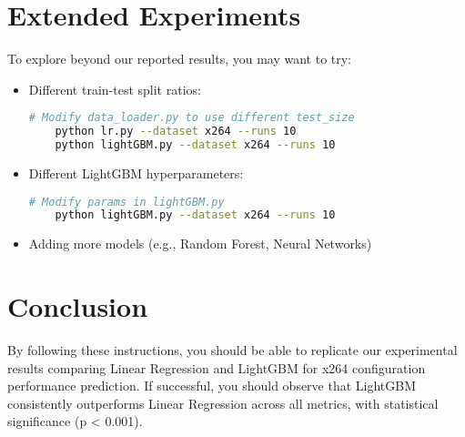 \documentclass[10pt]{article}
\begin{document}
\section{Extended Experiments}

To explore beyond our reported results, you may want to try:

\begin{itemize}
    \item Different train-test split ratios:
    \begin{lstlisting}[language=bash]
    # Modify data_loader.py to use different test_size
    python lr.py --dataset x264 --runs 10
    python lightGBM.py --dataset x264 --runs 10
    \end{lstlisting}
    
    \item Different LightGBM hyperparameters:
    \begin{lstlisting}[language=bash]
    # Modify params in lightGBM.py
    python lightGBM.py --dataset x264 --runs 10
    \end{lstlisting}
    
    \item Adding more models (e.g., Random Forest, Neural Networks)
\end{itemize}

\section{Conclusion}

By following these instructions, you should be able to replicate our experimental results comparing Linear Regression and LightGBM for x264 configuration performance prediction. If successful, you should observe that LightGBM consistently outperforms Linear Regression across all metrics, with statistical significance (p < 0.001).
\end{document}
